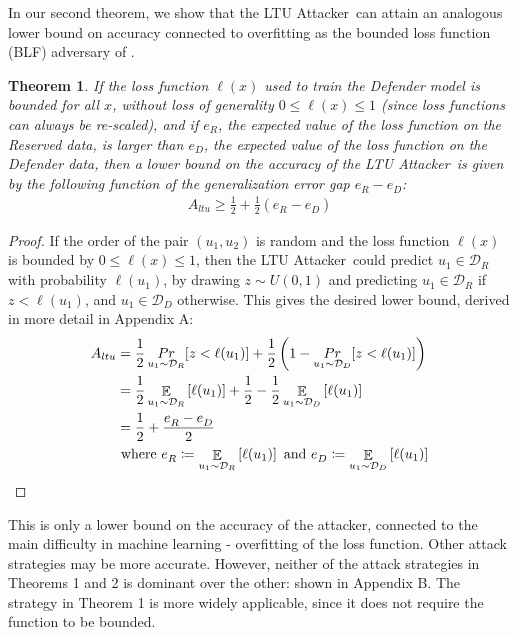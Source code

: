\documentclass[letterpaper]{article}
\newcommand{\oracle}{LTU Attacker~}
\newtheorem{theorem}{Theorem}
\begin{document}

In our second theorem, we show that the \oracle can attain an analogous lower bound on accuracy connected to overfitting as the bounded loss function (BLF) adversary of \cite{yeom2018privacy}.
\begin{theorem}\label{thm:blf}
If the loss function $\ell(x)$ used to train the Defender model is bounded for all $x$, without loss of generality $0 \le \ell(x) \le 1$ (since loss functions can always be re-scaled), and if $e_R$, the expected value of the loss function on the Reserved data, is larger than $e_D$, the expected value of the loss function on the Defender data, then a lower bound on the accuracy of the \oracle is given by the following function of the generalization error gap $e^{}_R - e^{}_D$:
\begin{align}
A_{ltu} \ge \frac{1}{2} + \frac{1}{2} (e^{}_R - e^{}_D)
\end{align}
\end{theorem}

\begin{proof}
If the order of the pair $(u_1,u_2)$ is random and the loss function $\ell(x)$ is bounded by $0 \le \ell(x)\le 1$, then the \oracle could predict $u_1 \in \mathcal{D}_R$ with probability $\ell(u_1)$, by drawing $z \sim U(0,1)$ and predicting $u_1 \in \mathcal{D}_R$ if $z < \ell(u_1)$, and $u_1 \in \mathcal{D}_D$ otherwise. This gives the desired lower bound, derived in more detail in Appendix A:
\begin{align}
A_{ltu} &= \frac{1}{2}\mathop{Pr}_{u_1 \sim \mathcal{D}_R}[z<\ell(u_1)] + \frac{1}{2}\left( 1 - \mathop{Pr}_{u_1 \sim \mathcal{D}_D}[z<\ell(u_1)]\right) \notag \\
&= \frac{1}{2}\mathop{\mathbb{E}}_{u_1 \sim \mathcal{D}_R}\left[\ell(u_1)\right] + \frac{1}{2} - \frac{1}{2}\mathop{\mathbb{E}}_{u_1 \sim \mathcal{D}_D}\left[ \ell(u_1)\right] \notag \\
&= \frac{1}{2} + \frac{e^{}_R - e^{}_D}{2} \\
& \text{ where } e^{}_R \coloneqq \mathop{\mathbb{E}}_{u_1 \sim \mathcal{D}_R}\left[\ell(u_1)\right] \text{ and } e^{}_D \coloneqq \mathop{\mathbb{E}}_{u_1 \sim \mathcal{D}_D}\left[\ell(u_1)\right] \notag
\end{align}
\end{proof}

This is only a lower bound on the accuracy of the attacker, connected to the main difficulty in machine learning - overfitting of the loss function. Other attack strategies may be more accurate. However, neither of the attack strategies in Theorems 1 and 2 is dominant over the other: shown in Appendix B. The strategy in Theorem 1 is more widely applicable, since it does not require the function to be bounded.
\end{document}
